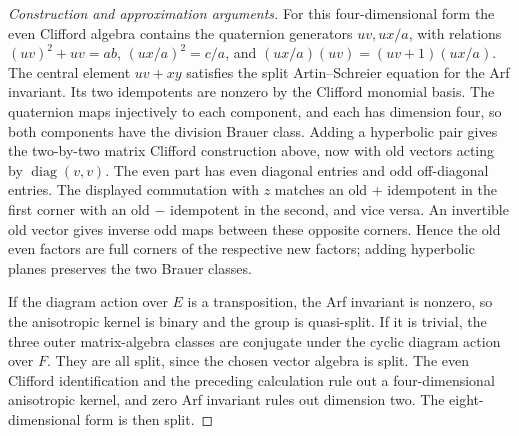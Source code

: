 \documentclass[11pt,a4paper,openany,oneside]{book}
\theoremstyle{resultstyle}
\theoremstyle{definition}
\numberwithin{equation}{chapter}
\begin{document}
\begin{proof}[Construction and approximation arguments]
For this four-dimensional form the even Clifford algebra
contains the quaternion generators \(uv,ux/a\), with relations
\((uv)^2+uv=ab\), \((ux/a)^2=c/a\), and
\((ux/a)(uv)=(uv+1)(ux/a)\). The central element \(uv+xy\)
satisfies the split Artin--Schreier equation for the Arf
invariant. Its two idempotents are nonzero by the Clifford
monomial basis. The quaternion maps injectively to each
component, and each has dimension four, so both components
have the division Brauer class. Adding a hyperbolic pair
gives the two-by-two matrix Clifford construction above,
now with old vectors acting by \(\operatorname{diag}(v,v)\).
The even part has even diagonal entries and odd
off-diagonal entries. The displayed commutation with \(z\)
matches an old \(+\) idempotent in the first corner with
an old \(-\) idempotent in the second, and vice versa.
An invertible old vector gives inverse odd maps between
these opposite corners. Hence the old even factors are
full corners of the respective new factors; adding
hyperbolic planes preserves the two Brauer classes.

If the diagram action over \(E\) is a transposition, the Arf
invariant is nonzero, so the anisotropic kernel is binary and
the group is quasi-split. If it is trivial, the three outer
matrix-algebra classes are conjugate under the cyclic
diagram action over \(F\). They are all split, since the
chosen vector algebra is split. The even Clifford
identification and the preceding calculation rule out a
four-dimensional anisotropic kernel, and zero Arf invariant
rules out dimension two. The eight-dimensional form is
then split.


\end{proof}
\end{document}
